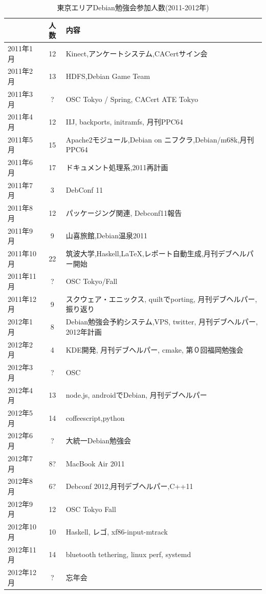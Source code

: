\documentclass[mingoth,a4paper]{jsarticle}
\begin{document}
\begin{table}[t]
\begin{minipage}{0.5\hsize}
\end{minipage}
\begin{minipage}{0.5\hsize}
 \caption{東京エリアDebian勉強会参加人数(2011-2012年)}\label{tab:count2011}
 \begin{center}
  \begin{tabular}{|l|c|p{12em}|}
 \hline
 & 人数 & 内容\\
 \hline
   2011年1月 & 12 & Kinect,アンケートシステム,CACertサイン会 \\
   2011年2月 & 13 & HDFS,Debian Game Team \\
   2011年3月 & ? & OSC Tokyo / Spring, CACert ATE Tokyo \\
   2011年4月 & 12 & IIJ, backports, initramfs, 月刊PPC64 \\
   2011年5月 & 15 & Apache2モジュール,Debian on ニフクラ,Debian/m68k,月刊PPC64 \\
   2011年6月 & 17 & ドキュメント処理系,2011再計画 \\
   2011年7月 & 3 & DebConf 11 \\
   2011年8月 & 12 & パッケージング関連, Debconf11報告 \\
   2011年9月 & 9 & 山喜旅館,Debian温泉2011 \\
   2011年10月 & 22 & 筑波大学,Haskell,LaTeX,レポート自動生成,月刊デブヘルパー開始\\
   2011年11月 & ? & OSC Tokyo/Fall \\
   2011年12月 & 9 & スクウェア・エニックス, quiltでporting, 月刊デブヘルパー,
	   振り返り \\
   2012年1月 & 8 & Debian勉強会予約システム,VPS, twitter, 
	   月刊デブヘルパー, 2012年計画 \\
   2012年2月 & 4 & KDE開発, 月刊デブヘルパー, cmake, 第０回福岡勉強会\\
   2012年3月 & ? & OSC \\
   2012年4月 & 13 & node.js, androidでDebian, 月刊デブヘルパー\\
   2012年5月 & 14 & coffeescript,python\\
   2012年6月 & ? & 大統一Debian勉強会 \\
   2012年7月 & 8? & MacBook Air 2011\\
   2012年8月 & 6? & Debconf 2012,月刊デブヘルパー,C++11 \\
   2012年9月 & 12 & OSC Tokyo Fall\\
   2012年10月 & 10 & Haskell, レゴ, xf86-input-mtrack\\
   2012年11月 & 14 & bluetooth tethering, linux perf, systemd\\
   2012年12月 & ? & 忘年会 \\

 \hline
  \end{tabular}
 \end{center}
\end{minipage}
\end{table}
\end{document}
